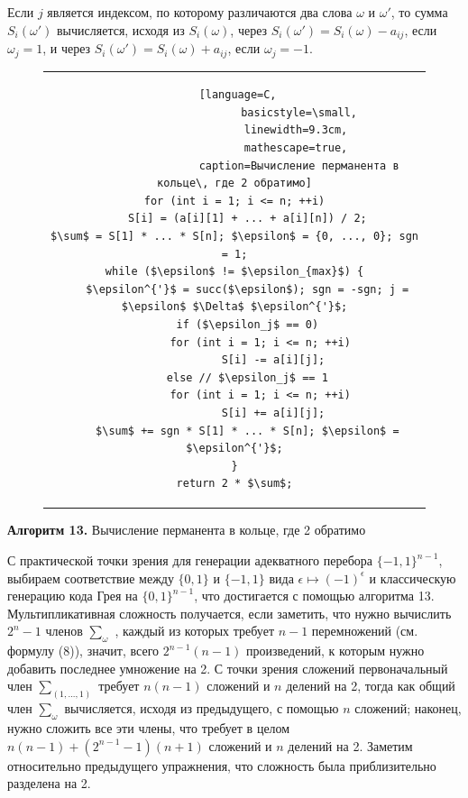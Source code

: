 \documentclass{../../template/mai_book}
\begin{document}
\noindent
Если $j$ является индексом, по которому различаются два слова $\omega$ и $\omega'$, то сумма $S_i(\omega')$ вычисляется, исходя из $S_i(\omega)$, через $S_i(\omega') = S_i(\omega) - a_{ij}$, если $\omega_j = 1$, и через $S_i(\omega') = S_i(\omega) + a_{ij}$, если $\omega_j = -1$.

\renewcommand{\figurename}{Алгоритм}

\begin{figure}[htp]
\centering
\begin{tabular}{c}
\begin{lstlisting} [language=C,
					basicstyle=\small,
					linewidth=9.3cm, 
					mathescape=true, 
					caption=Вычисление перманента в кольце\, где 2 обратимо]
for (int i = 1; i <= n; ++i)
	S[i] = (a[i][1] + ... + a[i][n]) / 2;
$\sum$ = S[1] * ... * S[n]; $\epsilon$ = {0, ..., 0}; sgn = 1;
while ($\epsilon$ != $\epsilon_{max}$) {
	$\epsilon^{'}$ = succ($\epsilon$); sgn = -sgn; j = $\epsilon$ $\Delta$ $\epsilon^{'}$;
	if ($\epsilon_j$ == 0)
		for (int i = 1; i <= n; ++i)
			S[i] -= a[i][j];
	else // $\epsilon_j$ == 1
		for (int i = 1; i <= n; ++i)
			S[i] += a[i][j];
	$\sum$ += sgn * S[1] * ... * S[n]; $\epsilon$ = $\epsilon^{'}$;
}
return 2 * $\sum$;
\end{lstlisting}
\end{tabular}
\end{figure}

\textbf{Алгоритм 13.} Вычисление перманента в кольце, где 2 обратимо \newline

С практической точки зрения для генерации адекватного перебора \linebreak $\{-1, 1\}^{n - 1}$, выбираем соответствие между $\{0, 1\}$ и $\{-1, 1\}$ вида $\epsilon \mapsto (-1)^\epsilon$ и классическую генерацию кода Грея на $\{0, 1\}^{n - 1}$, что достигается с помощью алгоритма 13. Мультипликативная сложность получается, если заметить, что нужно вычислить $2^n - 1$ членов ${\sum}_\omega$ , каждый из которых требует $n - 1$ перемножений (см. формулу (8)), значит, всего $2^{n - 1}(n - 1)$ произведений, к которым нужно добавить последнее умножение на 2. С точки зрения сложений первоначальный член ${\sum}_{(1,...,1)}$ требует $n(n - 1)$ сложений и $n$ делений на 2, тогда как общий член ${\sum}_\omega$ вычисляется, исходя из предыдущего, с помощью $n$ сложений; наконец, нужно сложить все эти члены, что требует в целом $n(n - 1) + (2^{n - 1} - 1)(n + 1)$ сложений и $n$ делений на 2. Заметим относительно предыдущего упражнения, что сложность была приблизительно разделена на 2.
\end{document}
